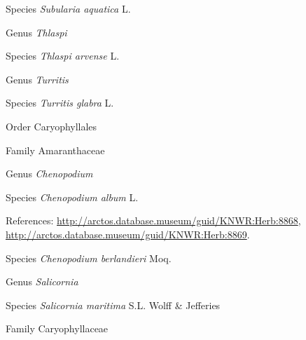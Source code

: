 \documentclass[9pt, article]{memoir}
\begin{document}
\begin{multicols}{2}
\vspace{6pt}\noindent\hspace{36pt}Species \textit{Subularia aquatica} L.


\vspace{6pt}\noindent\hspace{30pt}Genus \textit{Thlaspi}


\vspace{6pt}\noindent\hspace{36pt}Species \textit{Thlaspi arvense} L.


\vspace{6pt}\noindent\hspace{30pt}Genus \textit{Turritis}


\vspace{6pt}\noindent\hspace{36pt}Species \textit{Turritis glabra} L.


\vspace{6pt}\noindent\hspace{18pt}Order Caryophyllales


\vspace{6pt}\noindent\hspace{24pt}Family Amaranthaceae


\vspace{6pt}\noindent\hspace{30pt}Genus \textit{Chenopodium}


\vspace{6pt}\noindent\hspace{36pt}Species \textit{Chenopodium album} L.


\vspace{6pt}References: 
\url{http://arctos.database.museum/guid/KNWR:Herb:8868}, 
\url{http://arctos.database.museum/guid/KNWR:Herb:8869}.

\vspace{6pt}\noindent\hspace{36pt}Species \textit{Chenopodium berlandieri} Moq.


\vspace{6pt}\noindent\hspace{30pt}Genus \textit{Salicornia}


\vspace{6pt}\noindent\hspace{36pt}Species \textit{Salicornia maritima} S.L. Wolff \& Jefferies


\vspace{6pt}\noindent\hspace{24pt}Family Caryophyllaceae



\end{multicols}
\end{document}
